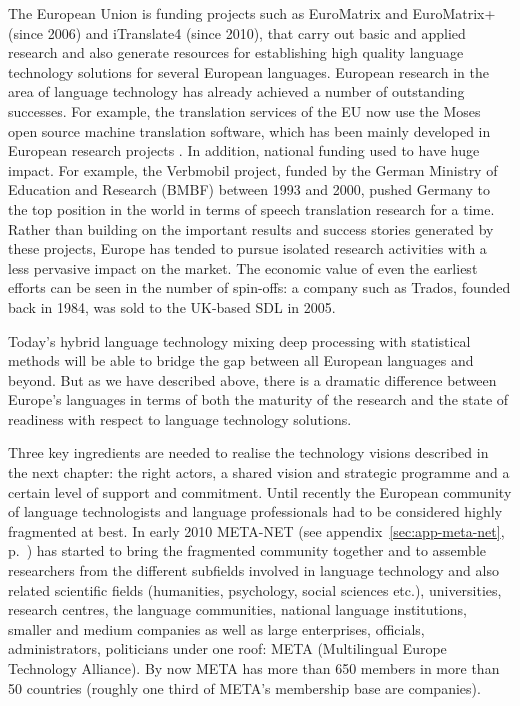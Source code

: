 \documentclass[10pt, plain]{../../metanetpaper}
\begin{document}
\begin{multicols}{2}
The European Union is funding projects such as EuroMatrix and EuroMatrix+ (since 2006) and iTranslate4 (since 2010), that carry out basic and applied research and also generate resources for establishing high quality language technology solutions for several European languages. European research in the area of language technology has already achieved a number of outstanding successes. For example, the translation services of the EU now use the Moses open source machine translation software, which has been mainly developed in European research projects \cite{moses}. In addition, national funding used to have huge impact. For example, the Verbmobil project, funded by the German Ministry of Education and Research (BMBF) between 1993 and 2000, pushed Germany to the top position in the world in terms of speech translation research for a time. Rather than building on the important results and success stories generated by these projects, Europe has tended to pursue isolated research activities with a less pervasive impact on the market. The economic value of even the earliest efforts can be seen in the number of spin-offs: a company such as Trados, founded back in 1984, was sold to the UK-based SDL in 2005.

Today’s hybrid language technology mixing deep processing with statistical methods will be able to bridge the gap between all European languages and beyond. But as we have described above, there is a dramatic difference between Europe’s languages in terms of both the maturity of the research and the state of readiness with respect to language technology solutions. 

Three key ingredients are needed to realise the technology visions described in the next chapter: the right actors, a shared vision and strategic programme and a certain level of support and commitment. Until recently the European community of language technologists and language professionals had to be considered highly fragmented at best. In early 2010 META-NET (see appendix~\ref{sec:app-meta-net}, p.~\pageref{sec:app-meta-net}) has started to bring the fragmented community together and to assemble researchers from the different subfields involved in language technology and also related scientific fields (humanities, psychology, social sciences etc.), universities, research centres, the language communities, national language institutions, smaller and medium companies as well as large enterprises, officials, administrators, politicians under one roof: META (Multilingual Europe Technology Alliance). By now META has more than 650 members in more than 50 countries (roughly one third of META's membership base are companies). 


\end{multicols}
\end{document}
